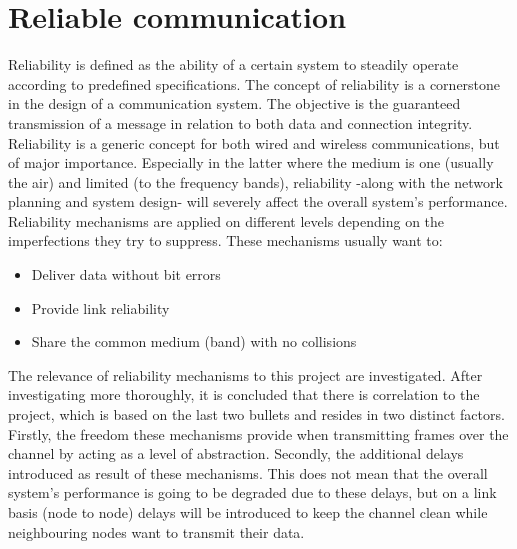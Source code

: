 \section{Reliable communication}
\label{sec:reliable_communication}
Reliability is defined as the ability of a certain system to steadily operate according to predefined specifications. The concept of reliability is a cornerstone in the design of a communication system. The objective is the guaranteed transmission of a message in relation to both data and connection integrity. Reliability is a generic concept for both wired and wireless communications, but of major importance. Especially in the latter where the medium is one (usually the air) and limited (to the frequency bands), reliability -along with the network planning and system design- will severely affect the overall system's performance. Reliability mechanisms are applied on different levels depending on the imperfections they try to suppress. These mechanisms usually want to:

\begin{itemize}
\item Deliver data without bit errors
\item Provide link reliability
\item Share the common medium (band) with no collisions
\end{itemize}

The relevance of reliability mechanisms to this project are investigated. After investigating more thoroughly, it is concluded that there is correlation to the project, which is based on the last two bullets and resides in two distinct factors. Firstly, the freedom these mechanisms provide when transmitting frames over the channel by acting as a level of abstraction. Secondly, the additional delays introduced as result of these mechanisms. This does not mean that the overall system's performance is going to be degraded due to these delays, but on a link basis (node to node) delays will be introduced to keep the channel clean while neighbouring nodes want to transmit their data.

